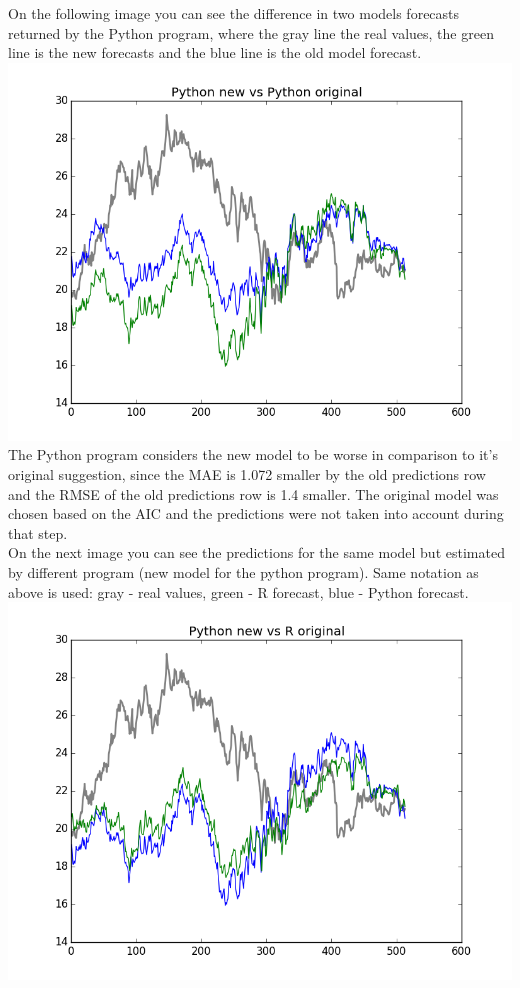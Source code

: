 \documentclass[
  twoside,
  12pt, a4paper,
  footinclude=true,
  headinclude=true,
  cleardoublepage=empty
]{article}
\begin{document}
On the following image you can see the difference in two models forecasts returned by the Python program, where the gray line the real values, the green line is the new forecasts and the blue line is the old model forecast.\\
\includegraphics[scale=0.75]{PythonOriginalVsPythonNew.png}\\
The Python program considers the new model to be worse in comparison to it's original suggestion, since the MAE is 1.072 smaller by the old predictions row and the RMSE of the old predictions row is 1.4 smaller. The original model was chosen based on the AIC and the predictions were not taken into account during that step.\\
On the next image you can see the predictions for the same model but estimated by different program (new model for the python program). Same notation as above is used: gray - real values, green - R forecast, blue - Python forecast.\\
\includegraphics[scale=0.75]{ROriginalVsPythonNew.png}
\end{document}
